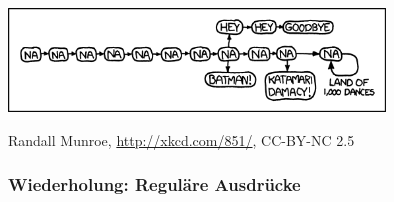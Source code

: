 \documentclass[onlymath]{beamer}
\author{\href{http://korrekt.org/}{Markus Kr\"{o}tzsch}\\Daniel Borchmann}
\begin{document}
\maketitle

\begin{frame}\frametitle{}

\includegraphics[width=10cm]{images/xkcd-na}

{\tiny Randall Munroe, \url{http://xkcd.com/851/}, CC-BY-NC 2.5}

\end{frame}



\begin{frame}\frametitle{Wiederholung: Reguläre Ausdrücke}

\end{frame}
\end{document}
